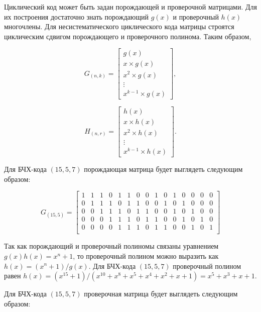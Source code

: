 Циклический код может быть задан порождающей и проверочной матрицами. Для их построения достаточно
знать порождающий $g(x)$ и проверочный $h(x)$ многочлены. Для несистематического циклического кода
матрицы строятся циклическим сдвигом порождающего и проверочного полинома. Таким образом,

\[ G_{(n, k)} = \left[
\begin{array}{ccc}
g(x) \\
x \times g(x) \\     
x^2 \times g(x) \\ 
\vdots \\
x^{k-1} \times g(x)
\end{array} \right],\] 

\[ H_{(n, r)} = \left[
\begin{array}{ccc}
h(x) \\
x \times h(x) \\     
x^2 \times h(x) \\ 
\vdots \\
x^{k-1} \times h(x)
\end{array} \right].\]

Для БЧХ-кода $(15, 5, 7)$ порождающая матрица будет выглядеть следующим образом:

\setcounter{MaxMatrixCols}{15}
\begin{equation}
G_{(15, 5)} =
\begin{bmatrix}
1 & 1 & 1 & 0 & 1 & 1 & 0 & 0 & 1 & 0 & 1 & 0 & 0 & 0 & 0\\
0 & 1 & 1 & 1 & 0 & 1 & 1 & 0 & 0 & 1 & 0 & 1 & 0 & 0 & 0\\
0 & 0 & 1 & 1 & 1 & 0 & 1 & 1 & 0 & 0 & 1 & 0 & 1 & 0 & 0\\
0 & 0 & 0 & 1 & 1 & 1 & 0 & 1 & 1 & 0 & 0 & 1 & 0 & 1 & 0\\
0 & 0 & 0 & 0 & 1 & 1 & 1 & 0 & 1 & 1 & 0 & 0 & 1 & 0 & 1\\
\end{bmatrix}
\end{equation}

Так как порождающий	и проверочный полиномы связаны уравнением $g(x)h(x)=x^n+1$, то
проверочный полином можно выразить как $h(x)=(x^n+1)/g(x)$. Для БЧХ-кода $(15, 5, 7)$
проверочный полином равен $h(x)=(x^{15}+1)/(x^{10}+x^8+x^5+x^4+x^2+x+1)=x^5+x^3+x+1$.
 
Для БЧХ-кода $(15, 5, 7)$ проверочная матрица будет выглядеть следующим образом:

